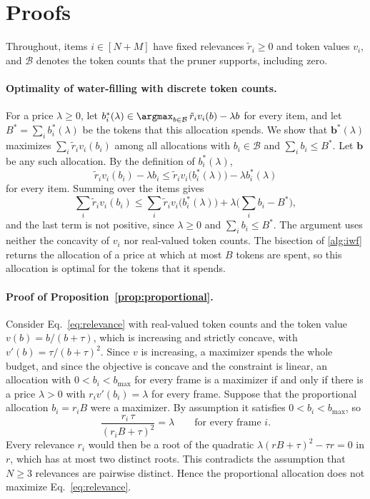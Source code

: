 \clearpage
\setcounter{page}{1}
\maketitlesupplementary
\appendix

\section{Proofs}
\label{app:proofs}

Throughout, items $i\in[N+M]$ have fixed relevances $\tilde r_i\ge0$ and token values $v_i$, and $\mathcal B$ denotes
the token counts that the pruner supports, including zero.

\paragraph{Optimality of water-filling with discrete token counts.}
For a price $\lambda\ge0$, let $b_i^*(\lambda)\in\argmax_{b\in\mathcal B}\,\tilde r_iv_i(b)-\lambda b$ for every item,
and let $B^*=\sum_ib_i^*(\lambda)$ be the tokens that this allocation spends. We show that $\mathbf b^*(\lambda)$
maximizes $\sum_i\tilde r_iv_i(b_i)$ among all allocations with $b_i\in\mathcal B$ and $\sum_ib_i\le B^*$. Let
$\mathbf b$ be any such allocation. By the definition of $b_i^*(\lambda)$,
\begin{equation*}
  \tilde r_iv_i(b_i)-\lambda b_i\le\tilde r_iv_i\big(b_i^*(\lambda)\big)-\lambda b_i^*(\lambda)
\end{equation*}
for every item. Summing over the items gives
\begin{equation*}
  \sum_i\tilde r_iv_i(b_i)\le\sum_i\tilde r_iv_i\big(b_i^*(\lambda)\big)+\lambda\Big(\sum_ib_i-B^*\Big) ,
\end{equation*}
and the last term is not positive, since $\lambda\ge0$ and $\sum_ib_i\le B^*$. The argument uses neither the
concavity of $v_i$ nor real-valued token counts. The bisection of \cref{alg:iwf} returns the allocation of a price at
which at most $B$ tokens are spent, so this allocation is optimal for the tokens that it spends.

\paragraph{Proof of Proposition~\ref{prop:proportional}.}
Consider Eq.~\eqref{eq:relevance} with real-valued token counts and the token value $v(b)=b/(b+\tau)$, which is
increasing and strictly concave, with $v'(b)=\tau/(b+\tau)^2$. Since $v$ is increasing, a maximizer spends the whole
budget, and since the objective is concave and the constraint is linear, an allocation with $0<b_i<b_{\max}$ for
every frame is a maximizer if and only if there is a price $\lambda>0$ with $r_iv'(b_i)=\lambda$ for every frame.
Suppose that the proportional allocation $b_i=r_iB$ were a maximizer. By assumption it satisfies $0<b_i<b_{\max}$, so
\begin{equation*}
  \frac{r_i\,\tau}{(r_iB+\tau)^2}=\lambda\qquad\text{for every frame } i .
\end{equation*}
Every relevance $r_i$ would then be a root of the quadratic $\lambda(rB+\tau)^2-\tau r=0$ in $r$, which has at most
two distinct roots. This contradicts the assumption that $N\ge3$ relevances are pairwise distinct. Hence the
proportional allocation does not maximize Eq.~\eqref{eq:relevance}.

